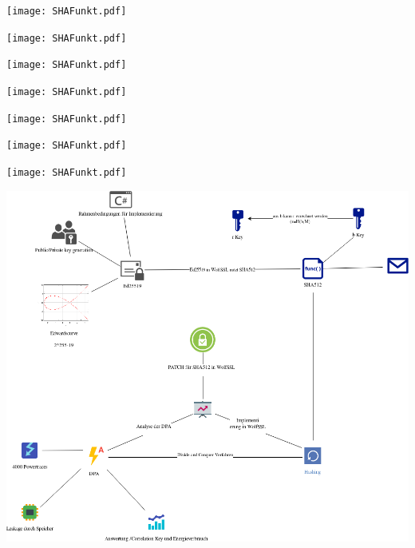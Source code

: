 \begin{frame}{}
\protect\hypertarget{section-14}{}
\texttt{[image: SHAFunkt.pdf]}
\end{frame}

\begin{frame}{}
\protect\hypertarget{section-15}{}
\texttt{[image: SHAFunkt.pdf]}
\end{frame}

\begin{frame}{}
\protect\hypertarget{section-16}{}
\texttt{[image: SHAFunkt.pdf]}
\end{frame}

\begin{frame}{}
\protect\hypertarget{section-17}{}
\texttt{[image: SHAFunkt.pdf]}
\end{frame}

\begin{frame}{}
\protect\hypertarget{section-18}{}
\texttt{[image: SHAFunkt.pdf]}
\end{frame}

\begin{frame}{}
\protect\hypertarget{section-19}{}
\texttt{[image: SHAFunkt.pdf]}
\end{frame}

\begin{frame}{}
\protect\hypertarget{section-20}{}
\texttt{[image: SHAFunkt.pdf]}
\end{frame}

\begin{frame}{}
\protect\hypertarget{section-21}{}
\includegraphics{Abbildungen/ITSEC(1).png}
\end{frame}

